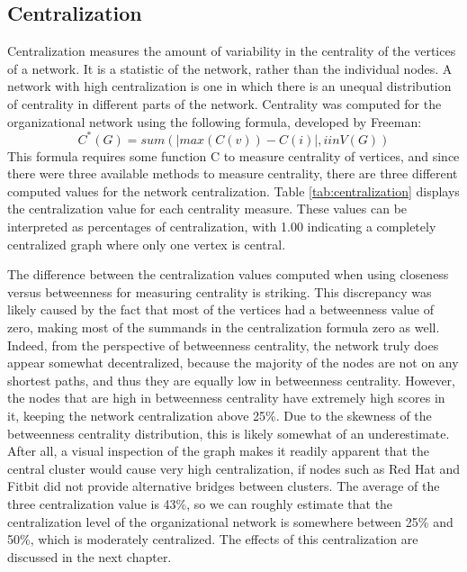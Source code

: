 \subsection{Centralization}
Centralization measures the amount of variability in the centrality of the vertices of a network. It is a statistic of the network, rather than the individual nodes. A network with high centralization is one in which there is an unequal distribution of centrality in different parts of the network.  Centrality was computed for the organizational network using the following formula, developed by Freeman\cite{freeman1978centrality}:
\begin{equation*}
C^*(G) = sum( |max(C(v))-C(i)|, i in V(G) )
\end{equation*}
This formula requires some function C to measure centrality of vertices, and since there were three available methods to measure centrality, there are three different computed values for the network centralization. Table \ref{tab:centralization} displays the centralization value for each centrality measure. These values can be interpreted as percentages of centralization, with 1.00 indicating a completely centralized graph where only one vertex is central.

The difference between the centralization values computed when using closeness versus betweenness for measuring centrality is striking. This discrepancy was likely caused by the fact that most of the vertices had a betweenness value of zero, making most of the summands in the centralization formula zero as well. Indeed, from the perspective of betweenness centrality, the network truly does appear somewhat decentralized, because the majority of the nodes are not on any shortest paths, and thus they are equally low in betweenness centrality. However, the nodes that are high in betweenness centrality have extremely high scores in it, keeping the network centralization above 25\%. Due to the skewness of the betweenness centrality distribution, this is likely somewhat of an underestimate. After all, a visual inspection of the graph makes it readily apparent that the central cluster would cause very high centralization, if nodes such as Red Hat and Fitbit did not provide alternative bridges between clusters. The average of the three centralization value is 43\%, so we can roughly estimate that the centralization level of the organizational network is somewhere between 25\% and 50\%, which is moderately centralized. The effects of this centralization are discussed in the next chapter.

